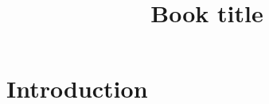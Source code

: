 \documentclass[11pt,twoside]{article}
\title{Book title}
\author{}
\date{}
\begin{document}
\maketitle

\begin{abstract}
\end{abstract}

\section{Introduction}



\end{document}

